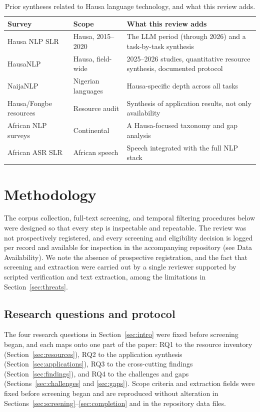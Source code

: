 \documentclass[sn-basic,pdflatex]{sn-jnl}
\begin{document}
\begin{table}[t]\centering\small
\caption{Prior syntheses related to Hausa language technology, and what this review adds.}
\label{tab:related}
\begin{tabular}{@{}p{}p{}p{}@{}}
\toprule
\textbf{Survey} & \textbf{Scope} & \textbf{What this review adds} \\
\midrule
Hausa NLP SLR \citep{p004} & Hausa, 2015--2020 & The LLM period (through 2026) and a task-by-task synthesis \\
HausaNLP \citep{p005} & Hausa, field-wide & 2025--2026 studies, quantitative resource synthesis, documented protocol \\
NaijaNLP \citep{p006} & Nigerian languages & Hausa-specific depth across all tasks \\
Hausa/Fongbe resources \citep{p007} & Resource audit & Synthesis of application results, not only availability \\
African NLP surveys \citep{p077,p078} & Continental & A Hausa-focused taxonomy and gap analysis \\
African ASR SLR \citep{p043} & African speech & Speech integrated with the full NLP stack \\
\bottomrule
\end{tabular}
\end{table}

\section{Methodology}\label{sec:method}
The corpus collection, full-text screening, and temporal filtering procedures below were designed so that every step is inspectable and repeatable. The review was not prospectively registered, and every screening and eligibility decision is logged per record and available for inspection in the accompanying repository (see Data Availability). We note the absence of prospective registration, and the fact that screening and extraction were carried out by a single reviewer supported by scripted verification and text extraction, among the limitations in Section~\ref{sec:threats}.

\subsection{Research questions and protocol}
The four research questions in Section~\ref{sec:intro} were fixed before screening began, and each maps onto one part of the paper: RQ1 to the resource inventory (Section~\ref{sec:resources}), RQ2 to the application synthesis (Section~\ref{sec:applications}), RQ3 to the cross-cutting findings (Section~\ref{sec:findings}), and RQ4 to the challenges and gaps (Sections~\ref{sec:challenges} and \ref{sec:gaps}). Scope criteria and extraction fields were fixed before screening began and are reproduced without alteration in Sections~\ref{sec:screening}--\ref{sec:completion} and in the repository data files.
\end{document}
